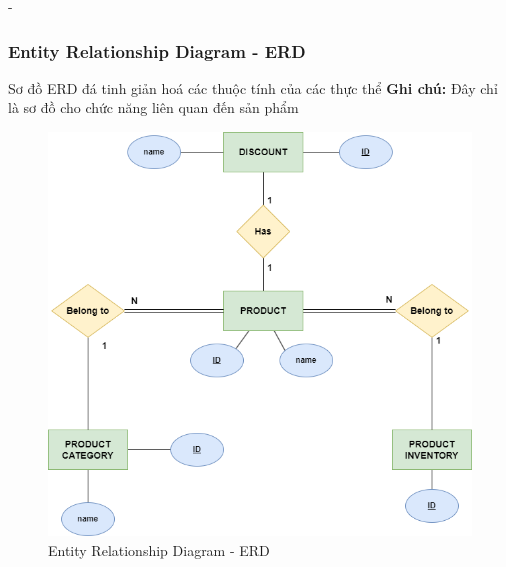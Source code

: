 \begin {list} {-}{}
\subsubsection {Entity Relationship Diagram - ERD}
Sơ đồ ERD đá tinh giản hoá các thuộc tính của các thực thể
\newline
\textbf{Ghi chú:} Đây chỉ là sơ đồ cho chức năng liên quan đến sản phẩm
\begin{figure}[h]
    \centering
    \includegraphics[scale=0.6]{images/hieu/chap-3/database-diagram.png}
    \caption{Entity Relationship Diagram - ERD}
\end{figure}

\end{list}
